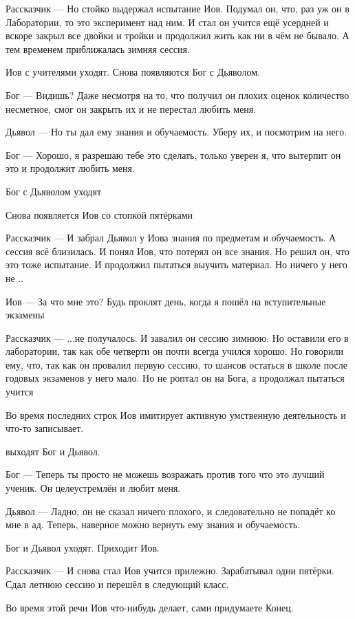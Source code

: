 \documentclass[10pt,a4paper]{article}
\begin{document}
Рассказчик — Но стойко выдержал испытание Иов. Подумал он, что, раз уж он в Лаборатории, то это эксперимент над ним. И стал он учится ещё усердней и вскоре закрыл все двойки и тройки и продолжил жить как ни в чём не бывало. А тем временем приближалась зимняя сессия.

Иов с учителями уходят.
Снова появляются Бог с Дьяволом.

Бог — Видишь? Даже несмотря на то, что получил он плохих оценок количество несметное, смог он закрыть их и не перестал любить меня.

Дьявол — Но ты дал ему знания и обучаемость. Уберу их, и посмотрим на него.

Бог — Хорошо, я разрешаю тебе это сделать, только уверен я, что вытерпит он это и продолжит любить меня.

Бог с Дьяволом уходят

 Снова появляется Иов со стопкой пятёрками

Рассказчик — И забрал Дьявол у Иова знания по предметам и обучаемость. А сессия всё близилась. И понял Иов, что потерял он все знания. Но решил он, что это тоже испытание. И продолжил пытаться выучить материал. Но ничего у него не ..

Иов — За что мне это? Будь проклят день, когда я пошёл на вступительные экзамены

Рассказчик — ...не получалось. И завалил он сессию зимнюю. Но оставили его в лаборатории, так как обе четверти он почти всегда учился хорошо. Но говорили ему, что, так как он провалил первую сессию, то шансов остаться в школе после годовых экзаменов у него мало. Но не роптал он на Бога, а продолжал пытаться учится

Во время последних строк Иов имитирует активную умственную деятельность и что-то записывает.

выходят Бог и Дьявол.

Бог — Теперь ты просто не можешь возражать против того что это лучший ученик. Он целеустремлён и любит меня.

Дьявол — Ладно, он не сказал ничего плохого, и следовательно не попадёт ко мне в ад. Теперь, наверное можно вернуть ему знания и обучаемость.

Бог и Дьявол уходят.
Приходит Иов.

Рассказчик — И снова стал Иов учится прилежно. Зарабатывал одни пятёрки. Сдал летнюю сессию и перешёл в  следующий класс.

Во время этой речи Иов что-нибудь делает, сами придумаете
Конец.
\end{document}
